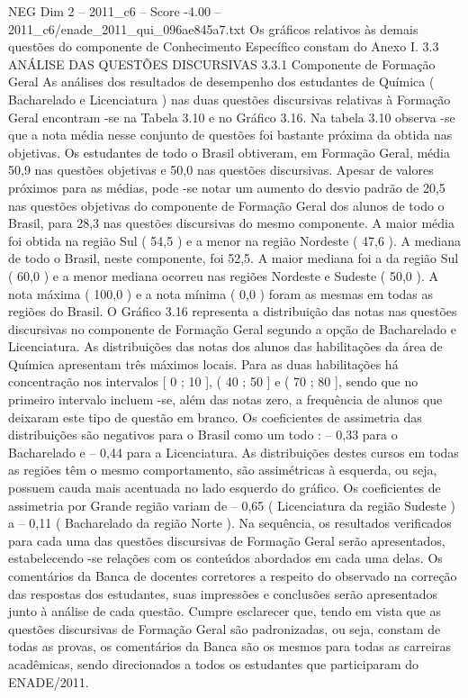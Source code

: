 \begin{textsample}{NEG Dim 2 – 2011\_c6 – Score -4.00 – 2011\_c6/enade\_2011\_qui\_096ae845a7.txt}
Os gráficos relativos às demais questões do componente de Conhecimento Específico constam do Anexo I. 3.3 ANÁLISE DAS QUESTÕES DISCURSIVAS 3.3.1 Componente de Formação Geral As análises dos resultados de desempenho dos estudantes de Química ( Bacharelado e Licenciatura ) nas duas questões discursivas relativas à Formação Geral encontram -se na Tabela 3.10 e no Gráfico 3.16.
Na tabela 3.10 observa -se que a nota média nesse conjunto de questões foi bastante próxima da obtida nas objetivas.
Os estudantes de todo o Brasil obtiveram, em Formação Geral, média 50,9 nas questões objetivas e 50,0 nas questões discursivas.
Apesar de valores próximos para as médias, pode -se notar um aumento do desvio padrão de 20,5 nas questões objetivas do componente de Formação Geral dos alunos de todo o Brasil, para 28,3 nas questões discursivas do mesmo componente.
A maior média foi obtida na região Sul ( 54,5 ) e a menor na região Nordeste ( 47,6 ).
A mediana de todo o Brasil, neste componente, foi 52,5.
A maior mediana foi a da região Sul ( 60,0 ) e a menor mediana ocorreu nas regiões Nordeste e Sudeste ( 50,0 ).
A nota máxima ( 100,0 ) e a nota mínima ( 0,0 ) foram as mesmas em todas as regiões do Brasil.
O Gráfico 3.16 representa a distribuição das notas nas questões discursivas no componente de Formação Geral segundo a opção de Bacharelado e Licenciatura.
As distribuições das notas dos alunos das habilitações da área de Química apresentam três máximos locais.
Para as duas habilitações há concentração nos intervalos [ 0 ; 10 ], ( 40 ; 50 ] e ( 70 ; 80 ], sendo que no primeiro intervalo incluem -se, além das notas zero, a frequência de alunos que deixaram este tipo de questão em branco.
Os coeficientes de assimetria das distribuições são negativos para o Brasil como um todo : – 0,33 para o Bacharelado e – 0,44 para a Licenciatura.
As distribuições destes cursos em todas as regiões têm o mesmo comportamento, são assimétricas à esquerda, ou seja, possuem cauda mais acentuada no lado esquerdo do gráfico.
Os coeficientes de assimetria por Grande região variam de – 0,65 ( Licenciatura da região Sudeste ) a – 0,11 ( Bacharelado da região Norte ).
Na sequência, os resultados verificados para cada uma das questões discursivas de Formação Geral serão apresentados, estabelecendo -se relações com os conteúdos abordados em cada uma delas.
Os comentários da Banca de docentes corretores a respeito do observado na correção das respostas dos estudantes, suas impressões e conclusões serão apresentados junto à análise de cada questão.
Cumpre esclarecer que, tendo em vista que as questões discursivas de Formação Geral são padronizadas, ou seja, constam de todas as provas, os comentários da Banca são os mesmos para todas as carreiras acadêmicas, sendo direcionados a todos os estudantes que participaram do ENADE/2011.

\end{textsample}
